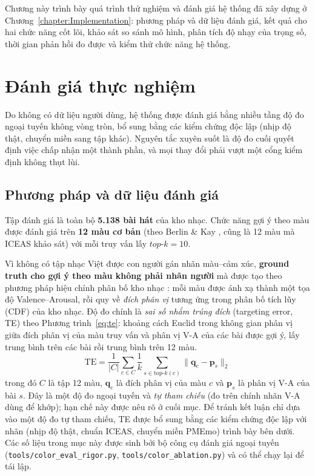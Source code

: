 \documentclass[../DoAn.tex]{subfiles}
\begin{document}
Chương này trình bày quá trình thử nghiệm và đánh giá hệ thống đã xây dựng ở Chương~\ref{chapter:Implementation}: phương pháp và dữ liệu đánh giá, kết quả cho hai chức năng cốt lõi, khảo sát so sánh mô hình, phân tích độ nhạy của trọng số, thời gian phản hồi đo được và kiểm thử chức năng hệ thống.

\section{Đánh giá thực nghiệm}
\label{section:eval}
Do không có dữ liệu người dùng, hệ thống được đánh giá bằng nhiều tầng độ đo ngoại tuyến không vòng tròn, bổ sung bằng các kiểm chứng độc lập (nhịp độ thật, chuyển miền sang tập khác). Nguyên tắc xuyên suốt là độ đo cuối quyết định việc chấp nhận một thành phần, và mọi thay đổi phải vượt một cổng kiểm định không thụt lùi.

\subsection{Phương pháp và dữ liệu đánh giá}
\label{subsection:eval-method}
Tập đánh giá là toàn bộ \textbf{5.138 bài hát} của kho nhạc. Chức năng gợi ý theo màu được đánh giá trên \textbf{12 màu cơ bản} (theo Berlin \& Kay \cite{berlin1969basic}, cũng là 12 màu mà ICEAS \cite{jonauskaite2020universal} khảo sát) với mỗi truy vấn lấy $top\text{-}k=10$.

Vì không có tập nhạc Việt được con người gán nhãn màu--cảm xúc, \textbf{ground truth cho gợi ý theo màu không phải nhãn người} mà được tạo theo phương pháp hiệu chỉnh phân bố kho nhạc \cite{steck2018calibrated}: mỗi màu được ánh xạ thành một tọa độ Valence--Arousal, rồi quy về \textit{đích phân vị} tương ứng trong phân bố tích lũy (CDF) của kho nhạc. Độ đo chính là \textit{sai số nhắm trúng đích} (targeting error, TE) theo Phương trình~\eqref{eq:te}: khoảng cách Euclid trong không gian phân vị giữa đích phân vị của màu truy vấn và phân vị V-A của các bài được gợi ý, lấy trung bình trên các bài rồi trung bình trên 12 màu.
\begin{equation}\label{eq:te}
    \text{TE} = \frac{1}{|C|}\sum_{c \in C} \frac{1}{k}\sum_{s \in \text{top-}k(c)} \big\lVert \mathbf{q}_c - \mathbf{p}_s \big\rVert_2
\end{equation}
trong đó $C$ là tập 12 màu, $\mathbf{q}_c$ là đích phân vị của màu $c$ và $\mathbf{p}_s$ là phân vị V-A của bài $s$. Đây là một độ đo ngoại tuyến và \textit{tự tham chiếu} (đo trên chính nhãn V-A dùng để khớp); hạn chế này được nêu rõ ở cuối mục. Để tránh kết luận chỉ dựa vào một độ đo tự tham chiếu, TE được bổ sung bằng các kiểm chứng độc lập với nhãn (nhịp độ thật, chuẩn ICEAS, chuyển miền PMEmo) trình bày bên dưới. Các số liệu trong mục này được sinh bởi bộ công cụ đánh giá ngoại tuyến (\texttt{tools/color\_eval\_rigor.py}, \texttt{tools/color\_ablation.py}) và có thể chạy lại để tái lập.
\end{document}
